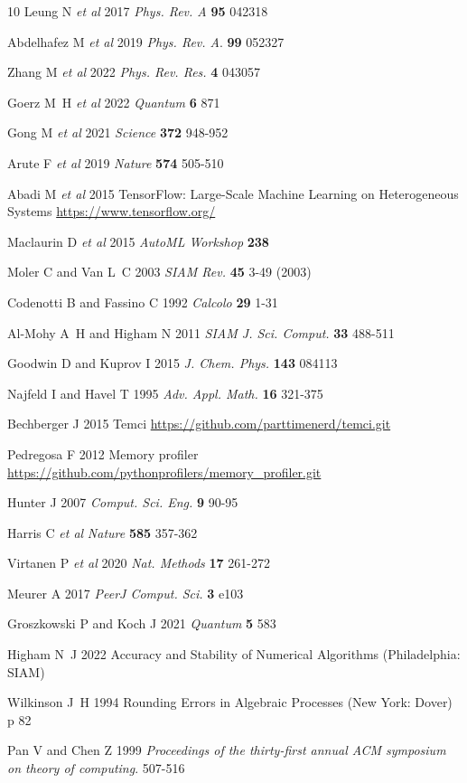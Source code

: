 \documentclass[letterpaper,10pt]{iopart}
\begin{document}
\begin{thebibliography}{10}
Leung N {\em et al\/} 
2017
{\em Phys. Rev. A}
{\bf95} 042318 

Abdelhafez M {\em et al\/} 
2019
{\em Phys. Rev. A}.
{\bf99} 052327 

Zhang M {\em et al\/} 
2022
{\em Phys. Rev. Res.}
{\bf4} 043057 

Goerz M~H {\em et al\/}
2022
{\em Quantum}
{\bf6}  871 

Gong M {\em et al\/}
2021
{\em Science}
{\bf372} 948-952 

Arute F {\em et al\/}
2019
{\em Nature}
\textbf{574} 505-510  

Abadi M {\em et al\/}
2015
TensorFlow: Large-Scale Machine Learning on Heterogeneous Systems
\url{https://www.tensorflow.org/}

Maclaurin D {\em et al\/}
2015
{\em AutoML Workshop}
\textbf{238}  

Moler C and Van L~C
2003
{\em SIAM Rev.}
\textbf{45} 3-49 (2003)

Codenotti B and Fassino C 
1992
{\em Calcolo}
\textbf{29} 1-31 

Al-Mohy A~H and Higham N 
2011
{\em SIAM J. Sci. Comput.}
\textbf{33} 488-511  

Goodwin D and Kuprov I
2015
{\em J. Chem. Phys.}
\textbf{143} 084113 

Najfeld I and Havel T 
1995
{\em Adv. Appl. Math. }
\textbf{16} 321-375 

Bechberger J
2015
Temci
\url{https://github.com/parttimenerd/temci.git}

Pedregosa F
2012
Memory profiler
\url{https://github.com/pythonprofilers/memory_profiler.git}

Hunter J
2007
{\em Comput. Sci. Eng.}
\textbf{9} 90-95 

Harris C {\em et al\/}
{\em Nature}
\textbf{585} 357-362 

Virtanen P {\em et al\/}
2020
{\em Nat. Methods}
\textbf{17} 261-272 

Meurer A 
2017
{\em PeerJ Comput. Sci.}
\textbf{3}  e103 

Groszkowski P and Koch J 
2021
{\em Quantum}
\textbf{5} 583 

Higham N~J
2022
Accuracy and Stability of Numerical Algorithms
(Philadelphia: SIAM)

Wilkinson J~H
1994
Rounding Errors in Algebraic Processes (New York: Dover)
p 82

Pan V and Chen Z 
1999
{\em Proceedings of the thirty-first annual ACM symposium on theory of computing}. 
 507-516 
\end{thebibliography}
\end{document}
